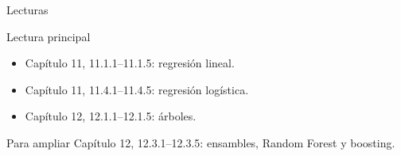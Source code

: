 \documentclass[aspectratio=169,10pt]{beamer}
\begin{document}
\begin{frame}{Lecturas}
  \small
  \begin{block}{Lectura principal}
    \begin{itemize}
      \item Capítulo 11, 11.1.1--11.1.5: regresión lineal.
      \item Capítulo 11, 11.4.1--11.4.5: regresión logística.
      \item Capítulo 12, 12.1.1--12.1.5: árboles.
    \end{itemize}
  \end{block}
  \begin{block}{Para ampliar}
    Capítulo 12, 12.3.1--12.3.5: ensambles, Random Forest y boosting.
  \end{block}
\end{frame}
\end{document}
